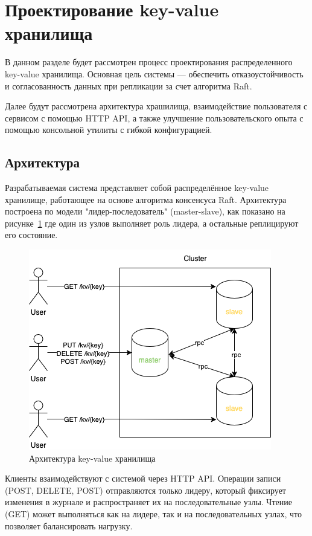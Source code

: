 \section{Проектирование key-value хранилища}

В данном разделе будет рассмотрен процесс проектирования распределенного key-value
хранилища. Основная цель системы — обеспечить отказоустойчивость и согласованность
данных при репликации за счет алгоритма Raft.

Далее будут рассмотрена архитектура храшилища, взаимодействие пользователя с сервисом с помощью HTTP API,
а также улучшение пользовательского опыта с помощью консольной утилиты с гибкой конфигурацией.

\subsection{Архитектура}

Разрабатываемая система представляет собой распределённое key-value хранилище,
работающее на основе алгоритма консенсуса Raft. Архитектура построена по модели
"лидер-последователь" (master-slave), как показано на рисунке~\ref{fig:fig1} где
один из узлов выполняет роль лидера, а остальные реплицируют его состояние.

\begin{figure}
  \centering
  \includegraphics[scale=0.6]{assets/kv_cluster.png}
  \caption{Архитектура key-value хранилища}
  \label{fig:fig1}
\end{figure}

Клиенты взаимодействуют с системой через HTTP API. Операции записи (POST, DELETE, POST)
отправляются только лидеру, который фиксирует изменения в журнале и распространяет их
на последовательные узлы. Чтение (GET) может выполняться как на лидере, так и на
последовательных узлах, что позволяет балансировать нагрузку.

